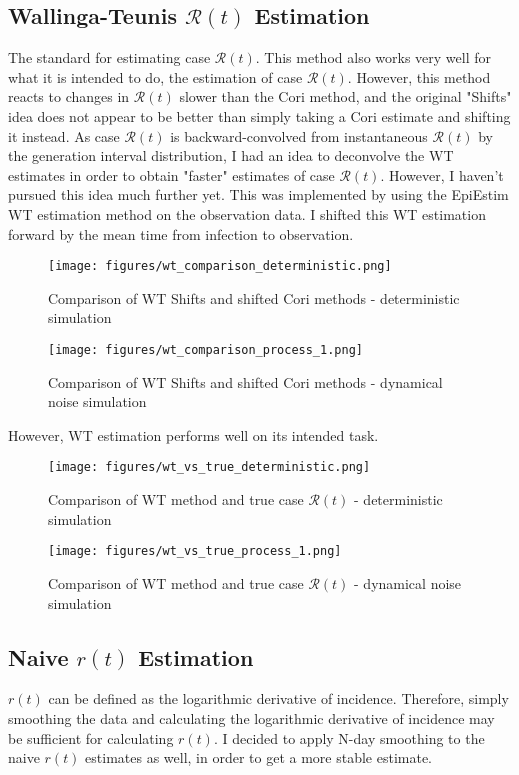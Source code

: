 \documentclass{article}
\newcommand{\nR}{\mathscr{R}}
\begin{document}
\subsection{Wallinga-Teunis $\nR(t)$ Estimation}
The standard for estimating case $\nR(t)$. This method also works very well for what it is intended to do, the estimation of case $\nR(t)$. However, this method reacts to changes in $\nR(t)$ slower than the Cori method, and the original "Shifts" idea does not appear to be better than simply taking a Cori estimate and shifting it instead. As case $\nR(t)$  is backward-convolved from instantaneous $\nR(t)$ by the generation interval distribution, I had an idea to deconvolve the WT estimates in order to obtain "faster" estimates of case $\nR(t)$. However, I haven't pursued this idea much further yet. This was implemented by using the EpiEstim WT estimation method on the observation data. I shifted this WT estimation forward by the mean time from infection to observation.

\begin{figure}[h!]
    \centering
    \texttt{[image: figures/wt\_comparison\_deterministic.png]}
    \caption{Comparison of WT Shifts and shifted Cori methods - deterministic simulation}
    \label{fig:my_label}
\end{figure}

\begin{figure}[h!]
    \centering
    \texttt{[image: figures/wt\_comparison\_process\_1.png]}
    \caption{Comparison of WT Shifts and shifted Cori methods - dynamical noise simulation}
    \label{fig:my_label}
\end{figure}

\clearpage
However, WT estimation performs well on its intended task.

\begin{figure}[h!]
    \centering
    \texttt{[image: figures/wt\_vs\_true\_deterministic.png]}
    \caption{Comparison of WT method and true case $\nR(t)$ - deterministic simulation}
    \label{fig:my_label}
\end{figure}

\begin{figure}[h!]
    \centering
    \texttt{[image: figures/wt\_vs\_true\_process\_1.png]}
    \caption{Comparison of WT method and true case $\nR(t)$ - dynamical noise simulation}
    \label{fig:my_label}
\end{figure}



\subsection{Naive $r(t)$ Estimation}
$r(t)$ can be defined as the logarithmic derivative of incidence. Therefore, simply smoothing the data and calculating the logarithmic derivative of incidence may be sufficient for calculating $r(t)$. I decided to apply N-day smoothing to the naive $r(t)$ estimates as well, in order to get a more stable estimate.
\end{document}
